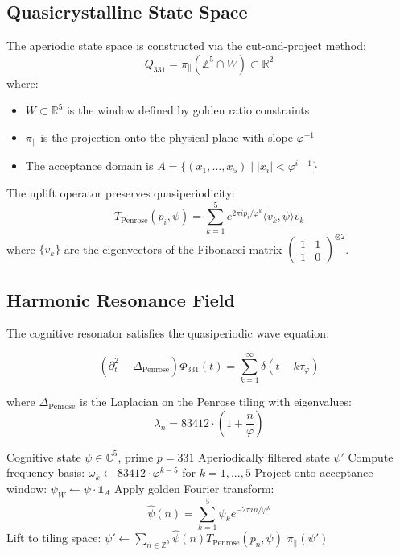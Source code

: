 \documentclass[12pt]{article}
\begin{document}
\subsection{Quasicrystalline State Space}
\begin{definition}
The aperiodic state space is constructed via the cut-and-project method:
\[
Q_{331} = \pi_\parallel(\mathbb{Z}^5 \cap W) \subset \mathbb{R}^2
\]
where:
\begin{itemize}
    \item $W \subset \mathbb{R}^5$ is the window defined by golden ratio constraints
    \item $\pi_\parallel$ is the projection onto the physical plane with slope $\varphi^{-1}$
    \item The acceptance domain is $A = \{(x_1,...,x_5) \mid |x_i| < \varphi^{i-1}\}$
\end{itemize}
\end{definition}

\begin{theorem}
The uplift operator preserves quasiperiodicity:
\[
T_{\text{Penrose}}(p_i, \psi) = \sum_{k=1}^5 e^{2\pi i p_i/\varphi^k} \langle v_k, \psi \rangle v_k
\]
where $\{v_k\}$ are the eigenvectors of the Fibonacci matrix $\begin{pmatrix}1 & 1 \\ 1 & 0\end{pmatrix}^{\otimes 2}$.
\end{theorem}

\subsection{Harmonic Resonance Field}
The cognitive resonator satisfies the quasiperiodic wave equation:

\begin{equation}
(\partial_t^2 - \Delta_{\text{Penrose}})\Phi_{331}(t) = \sum_{k=1}^\infty \delta(t - k\tau_\varphi)
\end{equation}

where $\Delta_{\text{Penrose}}$ is the Laplacian on the Penrose tiling with eigenvalues:
\[
\lambda_n = 83412 \cdot \left(1 + \frac{n}{\varphi}\right)
\]

\begin{algorithm}[H]
\caption{Penrose Tiling Ascension}
\begin{algorithmic}[1]
\Require Cognitive state $\psi \in \mathbb{C}^5$, prime $p=331$
\Ensure Aperiodically filtered state $\psi'$
\State Compute frequency basis: $\omega_k \gets 83412 \cdot \varphi^{k-5}$ for $k=1,...,5$
\State Project onto acceptance window: $\psi_W \gets \psi \cdot \mathbb{1}_A$
\State Apply golden Fourier transform:
\[
\hat{\psi}(n) = \sum_{k=1}^5 \psi_k e^{-2\pi i n/\varphi^k}
\]
\State Lift to tiling space: $\psi' \gets \sum_{n \in \mathbb{Z}^5} \hat{\psi}(n)T_{\text{Penrose}}(p_n, \psi)$
\State \Return $\pi_\parallel(\psi')$
\end{algorithmic}
\end{algorithm}
\end{document}
